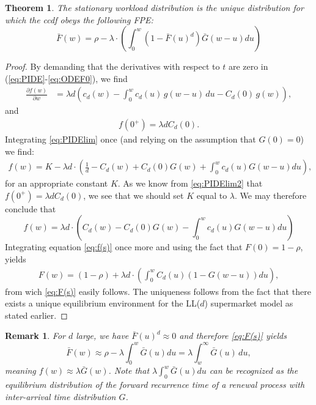 \documentclass[12pt]{report}
\newtheorem{theorem}{Theorem}
\newtheorem{remark}{Remark}
\begin{document}
\begin{theorem} \label{thm:LLd_workload_gen_sizes}
The stationary workload distribution is the unique distribution for which the ccdf obeys the following FPE:
\begin{equation}\label{eq:F(s)}
\bar F(w) = \rho - \lambda \cdot \left(
\int_{0}^w (1 - \bar{F}(u)^d) \bar G(w-u) du
\right)
\end{equation}
\end{theorem}
\begin{proof}
By demanding that the derivatives with respect to $t$ are zero in (\ref{eq:PIDE}-\ref{eq:ODEF0}), we find
\begin{align}\label{eq:PIDElim}
\frac{\partial f(w)}{\partial w}&=\lambda d \left(c_d(w) - \int_{0}^{w}c_d(u)\,g(w-u)\,du -C_d(0)\,g(w)\right),
\end{align}
and
\begin{align}\label{eq:PIDElim2}
f(0^+) = \lambda d C_d(0).
\end{align}
Integrating \eqref{eq:PIDElim} once (and relying on the assumption that $G(0) = 0$) we find:
\begin{align}
f(w)
=
K-\lambda d \cdot \left( \frac{1}{d}-C_d(w) + C_d(0) G(w) + \int_0^w c_d(u) G(w-u) du \right),
\end{align}
for an appropriate constant $K$. As we know from \eqref{eq:PIDElim2} that $f(0^+) = \lambda d C_d(0)$, we see that we should set $K$ equal to $\lambda$. We may therefore conclude that
\begin{equation}\label{eq:f(s)}
f(w) =
\lambda d \cdot
\left(
C_d(w) - C_d(0) G(w) - \int_0^w c_d(u) G(w-u) du
\right)
\end{equation}
Integrating equation \eqref{eq:f(s)} once more and using the fact that $F(0) = 1-\rho$, yields
\begin{align*}
F(w) = (1-\rho) + \lambda d  \cdot \left(
\int_{0}^w C_d(u) (1 - G(w-u)) du
\right),
\end{align*}
from wich \eqref{eq:F(s)} easily follows.
The uniqueness follows from the fact that there exists a unique equilibrium environment for the LL($d$) supermarket model
as stated earlier.
\end{proof}

\begin{remark}
For $d$ large, we have $\bar{F}(u)^d \approx 0$ and therefore \eqref{eq:F(s)} yields
\[ \bar F(w) \approx \rho - \lambda \int_{0}^w \bar G(u) du = \lambda \int_w^\infty \bar G(u) \, du ,\]
meaning $f(w) \approx \lambda \bar G(w)$. Note that $\lambda \int_{0}^w \bar G(u) du$ 
can be recognized as the equilibrium distribution of the forward recurrence time of a renewal
process with inter-arrival time distribution $G$.
\end{remark}
\end{document}
